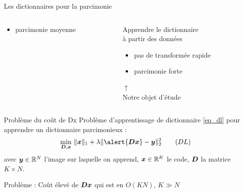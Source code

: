 \begin{frame}{Les dictionnaires pour la parcimonie}
\begin{columns}[t]
\begin{column}{0.49\textwidth}
\begin{block}{}
\begin{itemize}
	\item[\textcolor{red}{\xmark}] parcimonie moyenne
	\end{itemize}
	\end{block}
\end{column}
\begin{column}{0.49\textwidth}
	\begin{block}{}
	\alert{Apprendre} le dictionnaire\\
	à partir des données
	\begin{itemize}
	\item[\textcolor{red}{\xmark}] pas de transformée rapide
	\item[\textcolor{green2}{\cmark}] parcimonie forte
	\end{itemize}
	\end{block}
	\begin{tightcenter}
		$\uparrow$\\
		Notre objet d'étude
	\end{tightcenter}
\end{column}
\end{columns}


\end{frame}

\begin{frame}{Problème du coût de Dx}
Problème d'apprentissage de dictionnaire \eqref{eq_dl} pour apprendre un dictionnaire parcimonieux :
\begin{align} 
\underset{\D,\x}{\min}~ & \| \x \|_1 + \lambda \| \alert{\D\x}-\y \|^2_2 \tag{$DL$}\label{eq_dl} \\
\end{align}
 avec $\bm{y} \in \mathbb{R}^N$ l'image sur laquelle on apprend, $\bm{x} \in \mathbb{R}^{K}$ le code, $\bm{D}$ la matrice $K \times N$.

\begin{alertblock}{}
Problème : Coût élevé de \alert{$\bm{D}\bm{x}$} qui est en \alert{$O(KN)$}, $K \gg N$
\end{alertblock}
\end{frame}



